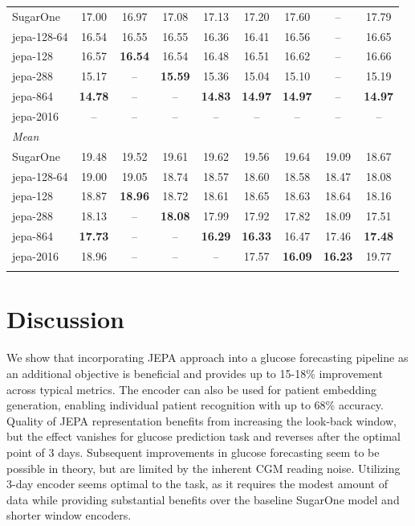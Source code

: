\documentclass[11pt,a4paper]{article}
\begin{document}
\begin{tabular}{lcccccccc}
  SugarOne & 17.00 & 16.97 & 17.08 & 17.13 & 17.20 & 17.60 & -- & 17.79 \\
  jepa-128-64 & 16.54 & 16.55 & 16.55 & 16.36 & 16.41 & 16.56 & -- & 16.65 \\
  jepa-128 & 16.57 & \textbf{16.54} & 16.54 & 16.48 & 16.51 & 16.62 & -- & 16.66 \\
  jepa-288 & 15.17 & -- & \textbf{15.59} & 15.36 & 15.04 & 15.10 & -- & 15.19 \\
  jepa-864 & \textbf{14.78} & -- & -- & \textbf{14.83} & \textbf{14.97} & \textbf{14.97} & -- & \textbf{14.97} \\
  jepa-2016 & -- & -- & -- & -- & -- & -- & -- & -- \\
  \hline
  \multicolumn{9}{l}{\textit{Mean}} \\
  SugarOne & 19.48 & 19.52 & 19.61 & 19.62 & 19.56 & 19.64 & 19.09 & 18.67 \\
  jepa-128-64 & 19.00 & 19.05 & 18.74 & 18.57 & 18.60 & 18.58 & 18.47 & 18.08 \\
  jepa-128 & 18.87 & \textbf{18.96} & 18.72 & 18.61 & 18.65 & 18.63 & 18.64 & 18.16 \\
  jepa-288 & 18.13 & -- & \textbf{18.08} & 17.99 & 17.92 & 17.82 & 18.09 & 17.51 \\
  jepa-864 & \textbf{17.73} & -- & -- & \textbf{16.29} & \textbf{16.33} & 16.47 & 17.46 & \textbf{17.48} \\
  jepa-2016 & 18.96 & -- & -- & -- & 17.57 & \textbf{16.09} & \textbf{16.23} & 19.77 \\
  \hline
  \caption{SugarJepa finetuning results.}
    \label{tab:sugar-jepa-finetuning}
\end{tabular}

\section{Discussion}
We show that incorporating JEPA approach into a glucose forecasting pipeline as an additional objective is beneficial and provides up to 15-18\% improvement across typical metrics. The encoder can also be used for patient embedding generation, enabling individual patient recognition with up to 68\% accuracy. Quality of JEPA representation benefits from increasing the look-back window, but the effect vanishes for glucose prediction task and reverses after the optimal point of 3 days. Subsequent improvements in glucose forecasting seem to be possible in theory, but are limited by the inherent CGM reading noise. Utilizing 3-day encoder seems optimal to the task, as it requires the modest amount of data while providing substantial benefits over the baseline SugarOne model and shorter window encoders.
\end{document}
